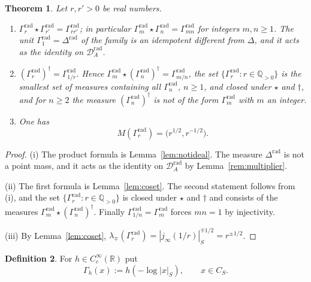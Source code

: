 \documentclass[11pt]{amsart}
\newtheorem{theorem}{Theorem}[section]
\theoremstyle{definition}
\newtheorem{definition}[theorem]{Definition}
\newcommand{\R}{\mathbb R}
\newcommand{\Q}{\mathbb Q}
\newcommand{\Drad}{\mathcal D_A^{\mathrm{rad}}}
\begin{document}
\begin{theorem}\label{thm:radmonoidal}
Let $r,r'>0$ be real numbers.
\begin{enumerate}
\item[(i)]
$\Gamma_r^{\mathrm{rad}}\star\Gamma_{r'}^{\mathrm{rad}}
=\Gamma_{rr'}^{\mathrm{rad}}$; in particular
$\Gamma_m^{\mathrm{rad}}\star\Gamma_n^{\mathrm{rad}}=\Gamma_{mn}^{\mathrm{rad}}$
for integers $m,n\ge1$. The unit $\Gamma_1^{\mathrm{rad}}=\Delta^{\mathrm{rad}}$
of the family is an idempotent different from $\Delta$, and it acts as the
identity on $\Drad$.
\item[(ii)] $(\Gamma_r^{\mathrm{rad}})^\dagger=\Gamma_{1/r}^{\mathrm{rad}}$.
Hence $\Gamma_m^{\mathrm{rad}}\star(\Gamma_n^{\mathrm{rad}})^\dagger
=\Gamma_{m/n}^{\mathrm{rad}}$, the set
$\{\Gamma_r^{\mathrm{rad}}:r\in\Q_{>0}\}$ is the smallest set of measures
containing all $\Gamma_n^{\mathrm{rad}}$, $n\ge1$, and closed under $\star$
and $\dagger$, and for $n\ge2$ the measure $(\Gamma_n^{\mathrm{rad}})^\dagger$
is not of the form $\Gamma_m^{\mathrm{rad}}$ with $m$ an integer.
\item[(iii)] One has
\begin{equation}\label{eq:radbidegree}
  M(\Gamma_r^{\mathrm{rad}})=\bigl(r^{1/2},r^{-1/2}\bigr).
\end{equation}
\end{enumerate}
\end{theorem}

\begin{proof}
(i) The product formula is Lemma~\ref{lem:notideal}. The measure
$\Delta^{\mathrm{rad}}$ is not a point mass, and it acts as the identity on
$\Drad$ by Lemma~\ref{rem:multiplier}.

(ii) The first formula is Lemma~\ref{lem:coset}. The second statement
follows from (i), and the set
$\{\Gamma_r^{\mathrm{rad}}:r\in\Q_{>0}\}$ is closed under $\star$ and
$\dagger$ and consists of the measures
$\Gamma_m^{\mathrm{rad}}\star(\Gamma_n^{\mathrm{rad}})^\dagger$. Finally
$\Gamma_{1/n}^{\mathrm{rad}}=\Gamma_m^{\mathrm{rad}}$ forces $mn=1$ by
injectivity.

(iii) By Lemma~\ref{lem:coset},
$\lambda_\mp(\Gamma_r^{\mathrm{rad}})=|j_\infty(1/r)|_S^{\mp1/2}=r^{\pm1/2}$.
\end{proof}

\begin{definition}\label{def:smeared}
For $h\in C_c^\infty(\R)$ put
\begin{equation}\label{eq:smeared}
   \Gamma_h(x):=h(-\log|x|_S),\qquad x\in C_S .
\end{equation}
\end{definition}
\end{document}
